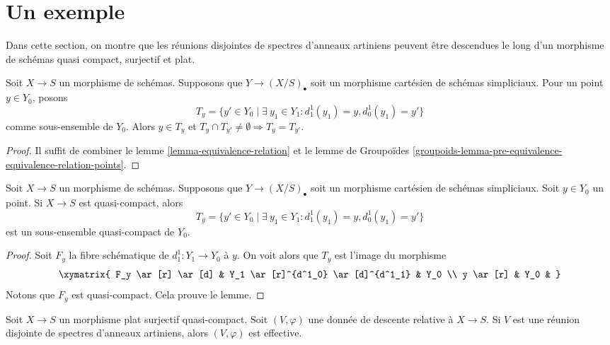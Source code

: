\section{Un exemple}
\label{section-example}

\noindent
Dans cette section, on montre que les réunions disjointes de spectres
d'anneaux artiniens peuvent être descendues le long d'un morphisme de schémas
quasi compact, surjectif et plat.

\begin{lemma}
\label{lemma-equivalence-classes-points}
Soit $X \to S$ un morphisme de schémas. Supposons que $Y \to (X/S)_\bullet$
soit un morphisme cartésien de schémas simpliciaux. Pour un point $y \in Y_0$, posons
$$
T_y = \{y' \in Y_0 \mid \exists\ y_1 \in Y_1:
d^1_1(y_1) = y, d^1_0(y_1) = y'\}
$$
comme sous-ensemble de $Y_0$. Alors $y \in T_y$ et
$T_y \cap T_{y'} \not = \emptyset \Rightarrow T_y = T_{y'}$.
\end{lemma}

\begin{proof}
Il suffit de combiner le lemme \ref{lemma-equivalence-relation} et le
lemme de Groupoïdes
\ref{groupoids-lemma-pre-equivalence-equivalence-relation-points}.
\end{proof}

\begin{lemma}
\label{lemma-quasi-compact}
Soit $X \to S$ un morphisme de schémas.
Supposons que $Y \to (X/S)_\bullet$ soit un morphisme cartésien de schémas simpliciaux.
Soit $y \in Y_0$ un point. Si $X \to S$ est quasi-compact, alors
$$
T_y = \{y' \in Y_0 \mid \exists\ y_1 \in Y_1:
d^1_1(y_1) = y, d^1_0(y_1) = y'\}
$$
est un sous-ensemble quasi-compact de $Y_0$.
\end{lemma}

\begin{proof}
Soit $F_y$ la fibre schématique de $d^1_1 : Y_1 \to Y_0$
à $y$. On voit alors que $T_y$ est l'image du morphisme
$$
\xymatrix{
F_y \ar[r] \ar[d] &
Y_1 \ar[r]^{d^1_0} \ar[d]^{d^1_1} &
Y_0 \\
y \ar[r] &
Y_0 &
}
$$
Notons que $F_y$ est quasi-compact. Cela prouve le lemme.
\end{proof}

\begin{lemma}
\label{lemma-descent-disjoint-union-Artinian-along-fields}
Soit $X \to S$ un morphisme plat surjectif quasi-compact.
Soit $(V, \varphi)$ une donnée de descente relative
à $X \to S$. Si $V$ est une réunion disjointe de spectres
d'anneaux artiniens, alors $(V, \varphi)$ est effective.
\end{lemma}

